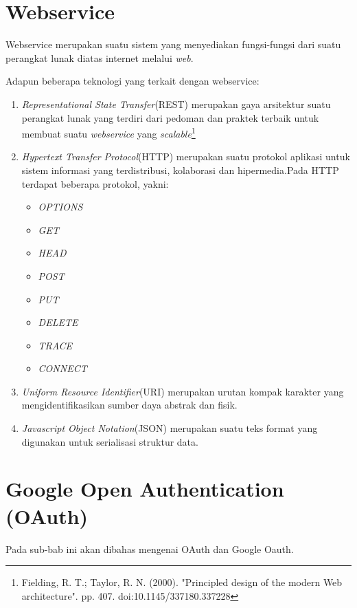 \section{Webservice}
\label{sec:webservice}

Webservice merupakan suatu sistem yang menyediakan fungsi-fungsi dari suatu perangkat lunak diatas internet melalui \textit{web}.

Adapun beberapa teknologi yang terkait dengan webservice:
\begin{enumerate}
	\item \textit{Representational State Transfer}(REST) merupakan gaya arsitektur suatu perangkat lunak yang terdiri dari pedoman dan praktek terbaik untuk membuat suatu \textit{webservice} yang \textit{scalable}\footnote{Fielding, R. T.; Taylor, R. N. (2000). "Principled design of the modern Web architecture". pp. 407. doi:10.1145/337180.337228}
	\item \textit{Hypertext Transfer Protocol}(HTTP) merupakan suatu protokol aplikasi untuk sistem informasi yang terdistribusi, kolaborasi dan hipermedia.Pada HTTP terdapat beberapa protokol, yakni:
	\begin{itemize}
		\item \textit{OPTIONS}
		\item \textit{GET}
		\item \textit{HEAD}
		\item \textit{POST}
		\item \textit{PUT}
		\item \textit{DELETE}
		\item \textit{TRACE}
		\item \textit{CONNECT}
	\end{itemize}
	\item \textit{Uniform Resource Identifier}(URI) merupakan urutan kompak karakter yang mengidentifikasikan sumber daya abstrak dan fisik\cite{rfc3986}.
	\item \textit{Javascript Object Notation}(JSON) merupakan suatu teks format yang digunakan untuk serialisasi struktur data\cite{rfc7159}.
\end{enumerate}

\section{Google Open Authentication (OAuth)}
\label{sec:googleopenauthentication}

Pada sub-bab ini akan dibahas mengenai OAuth dan Google Oauth.

